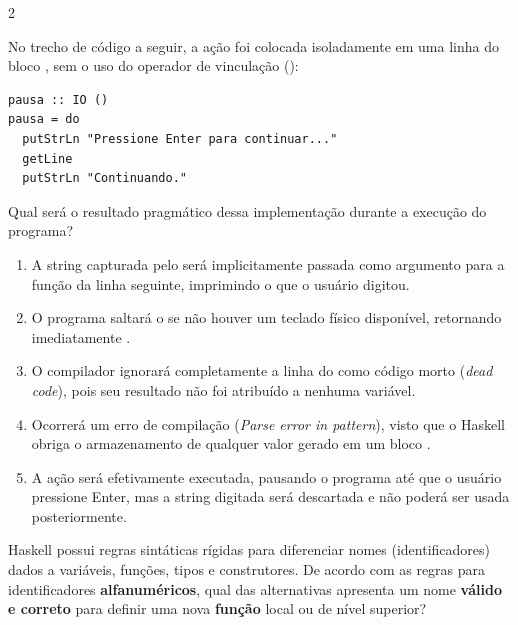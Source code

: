\documentclass[a4paper,10pt,brazil]{article}
\begin{document}
\begin{multicols}{2}
\begin{enumerate}
\end{enumerate}

No trecho de código a seguir, a ação  foi colocada isoladamente em uma linha do bloco , sem o uso do operador de vinculação (\haskellinline{<-}):

\begin{verbatim}
pausa :: IO ()
pausa = do
  putStrLn "Pressione Enter para continuar..."
  getLine
  putStrLn "Continuando."
\end{verbatim}

Qual será o resultado pragmático dessa implementação durante a execução do programa?

\begin{enumerate}
  \item A string capturada pelo  será implicitamente passada como argumento para a função  da linha seguinte, imprimindo o que o usuário digitou.

  \item O programa saltará o  se não houver um teclado físico disponível, retornando imediatamente .

  \item O compilador ignorará completamente a linha do  como código morto (\emph{dead code}), pois seu resultado não foi atribuído a nenhuma variável.

  \item Ocorrerá um erro de compilação (\emph{Parse error in pattern}), visto que o Haskell obriga o armazenamento de qualquer valor gerado em um bloco .

  \item A ação  será efetivamente executada, pausando o programa até que o usuário pressione Enter, mas a string digitada será descartada e não poderá ser usada posteriormente.


\end{enumerate}

Haskell possui regras sintáticas rígidas para diferenciar nomes (identificadores) dados a variáveis, funções, tipos e construtores. De acordo com as regras para identificadores \textbf{alfanuméricos}, qual das alternativas apresenta um nome \textbf{válido e correto} para definir uma nova \textbf{função} local ou de nível superior?


\end{multicols}
\end{document}
